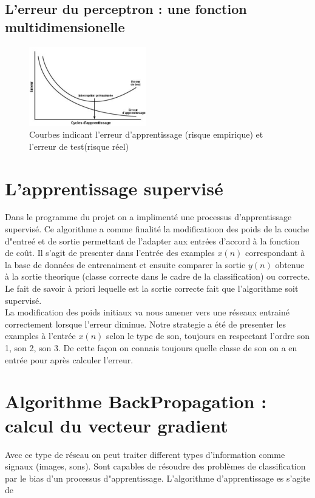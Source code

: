 \documentclass[journal]{IEEEtran}
\begin{document}
\subsection{L’erreur du perceptron : une fonction multidimensionelle}\blindtext

\begin{figure}[h]
	\centering
	\includegraphics[width=2in]{error}
	\caption{Courbes indicant l'erreur d'apprentissage (risque empirique) et l'erreur de test(risque réel)}
	\label{fig:courbesError}
\end{figure}

\section{L’apprentissage supervisé}
Dans le programme du projet on a implimenté une processus d'apprentissage supervisé. Ce algorithme a 
comme finalité la modificatioon des poids de la couche d"entreé et de sortie permettant de l'adapter aux 
entrées d'accord à la fonction de coût.
Il s'agit de presenter dans l'entrée des examples $x(n)$ correspondant à la base de données de entrenaiment et 
ensuite comparer la sortie $ y(n) $ obtenue à la sortie theorique (classe correcte dans le cadre de la classification) ou correcte. Le fait de savoir à priori lequelle est la sortie correcte fait que l'algorithme
soit supervisé.\\
La modification des poids initiaux  va nous amener vers une réseaux entrainé correctement lorsque l'erreur 
diminue.
Notre strategie a été de presenter les examples à l'entrée  $x(n)$ selon le type de son, toujours en respectant l'ordre son 1, son 2, son 3. De cette façon on connais toujours quelle classe de son on a en
entrée pour après calculer l'erreur.


\section{Algorithme BackPropagation : calcul du vecteur gradient}\blindtext

Avec ce type de réseau on peut traiter different types d'information comme signaux (images, sons). 
Sont capables de résoudre des problèmes de classification par le bias d'un processus d"apprentissage.
L'algorithme d'apprentissage es s'agite de 
\end{document}
